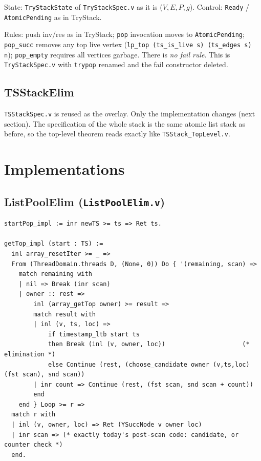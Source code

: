 \documentclass[11pt]{article}
\theoremstyle{definition}
\theoremstyle{remark}
\newcommand{\code}[1]{\texttt{#1}}
\newcommand{\file}[1]{\texttt{#1}}
\begin{document}
State: \code{TryStackState} of \file{TryStackSpec.v} as it is
($V,E,P,g$). Control: \code{Ready} / \code{AtomicPending} as in
TryStack.

Rules: push inv/res as in TryStack; \code{pop} invocation moves to
\code{AtomicPending}; \code{pop\_succ} removes any top live vertex
(\code{lp\_top (ts\_is\_live s) (ts\_edges s) n}); \code{pop\_empty}
requires all vertices garbage. There is \emph{no fail rule}. This is
\file{TryStackSpec.v} with \code{trypop} renamed and the fail
constructor deleted.

\subsection{TSStackElim}

\file{TSStackSpec.v} is reused as the overlay. Only the implementation
changes (next section). The specification of the whole stack is the same
atomic list stack as before, so the top-level theorem reads exactly like
\file{TSStack\_TopLevel.v}.

\section{Implementations}
\label{sec:impls}

\subsection{ListPoolElim (\file{ListPoolElim.v})}

\begin{lstlisting}
startPop_impl := inr newTS >= ts => Ret ts.

getTop_impl (start : TS) :=
  inl array_resetIter >= _ =>
  From (ThreadDomain.threads D, (None, 0)) Do { '(remaining, scan) =>
    match remaining with
    | nil => Break (inr scan)
    | owner :: rest =>
        inl (array_getTop owner) >= result =>
        match result with
        | inl (v, ts, loc) =>
            if timestamp_ltb start ts
            then Break (inl (v, owner, loc))                     (* elimination *)
            else Continue (rest, (choose_candidate owner (v,ts,loc) (fst scan), snd scan))
        | inr count => Continue (rest, (fst scan, snd scan + count))
        end
    end } Loop >= r =>
  match r with
  | inl (v, owner, loc) => Ret (YSuccNode v owner loc)
  | inr scan => (* exactly today's post-scan code: candidate, or counter check *)
  end.
\end{lstlisting}
\end{document}
